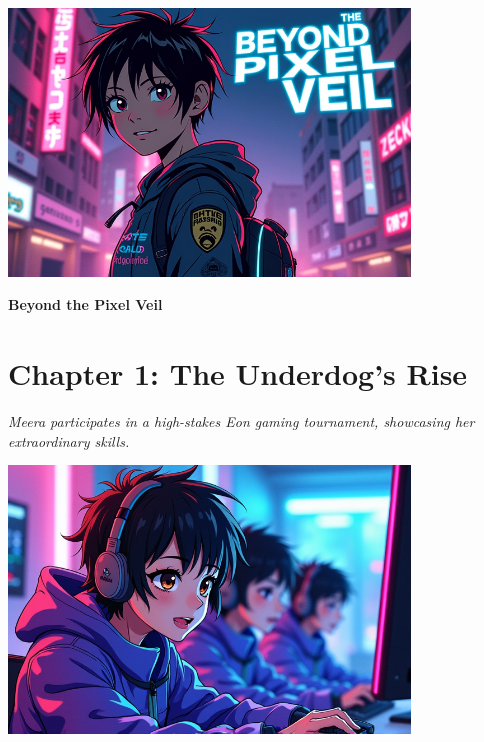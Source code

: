 \documentclass[12pt]{report}  %
\begin{document}
    \onehalfspacing
    \begin{center}\n\includegraphics[width=0.8\textwidth]{stories/my_story/step_6/scenes/title.png}
\vspace{1cm}

    {\Huge \textbf{Beyond the Pixel Veil}} \\[2cm]
    \end{center}
    
    \newpage
    \chapter*{Chapter 1: The Underdog's Rise}
\textit{Meera participates in a high-stakes Eon gaming tournament, showcasing her extraordinary skills.}

\begin{center}
\includegraphics[width=0.8\textwidth]{stories/my_story/step_6/scenes/gaming_tournament.live.png}
\end{center}
\end{document}
